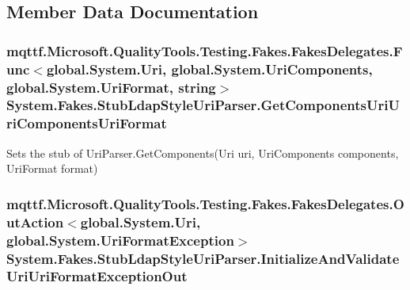\subsection{Member Data Documentation}
\hypertarget{class_system_1_1_fakes_1_1_stub_ldap_style_uri_parser_a6c7d9d9b026415bd3ac15a36f3bd0d1f}{
\subsubsection[{Get\-Components\-Uri\-Uri\-Components\-Uri\-Format}]{\setlength{\rightskip}{0pt plus 5cm}mqttf.\-Microsoft.\-Quality\-Tools.\-Testing.\-Fakes.\-Fakes\-Delegates.\-Func$<$global.\-System.\-Uri, global.\-System.\-Uri\-Components, global.\-System.\-Uri\-Format, string$>$ System.\-Fakes.\-Stub\-Ldap\-Style\-Uri\-Parser.\-Get\-Components\-Uri\-Uri\-Components\-Uri\-Format}}\label{class_system_1_1_fakes_1_1_stub_ldap_style_uri_parser_a6c7d9d9b026415bd3ac15a36f3bd0d1f}


Sets the stub of Uri\-Parser.\-Get\-Components(\-Uri uri, Uri\-Components components, Uri\-Format format)

\hypertarget{class_system_1_1_fakes_1_1_stub_ldap_style_uri_parser_a0daab8f98e6231d6ab68c11337e9915b}{
\subsubsection[{Initialize\-And\-Validate\-Uri\-Uri\-Format\-Exception\-Out}]{\setlength{\rightskip}{0pt plus 5cm}mqttf.\-Microsoft.\-Quality\-Tools.\-Testing.\-Fakes.\-Fakes\-Delegates.\-Out\-Action$<$global.\-System.\-Uri, global.\-System.\-Uri\-Format\-Exception$>$ System.\-Fakes.\-Stub\-Ldap\-Style\-Uri\-Parser.\-Initialize\-And\-Validate\-Uri\-Uri\-Format\-Exception\-Out}}\label{class_system_1_1_fakes_1_1_stub_ldap_style_uri_parser_a0daab8f98e6231d6ab68c11337e9915b}


